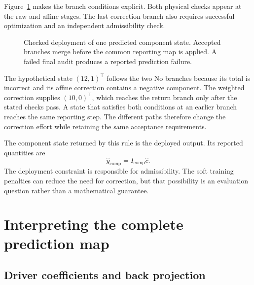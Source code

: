 Figure~\ref{fig:ch5_checked_deployment} makes the branch conditions explicit. Both physical checks appear at the raw and affine stages. The last correction branch also requires successful optimization and an independent admissibility check.

\begin{figure}[htbp]
\centering

\caption{Checked deployment of one predicted component state. Accepted branches merge before the common reporting map is applied. A failed final audit produces a reported prediction failure.}
\label{fig:ch5_checked_deployment}
\end{figure}

The hypothetical state \((12,1)^\top\) follows the two No branches because its total is incorrect and its affine correction contains a negative component. The weighted correction supplies \((10,0)^\top\), which reaches the return branch only after the stated checks pass. A state that satisfies both conditions at an earlier branch reaches the same reporting step. The different paths therefore change the correction effort while retaining the same acceptance requirements.

The component state returned by this rule is the deployed output. Its reported quantities are
\begin{equation}
\label{eq:icsor_deployed_composites}
\widehat y_{\mathrm{comp}}=I_{\mathrm{comp}}\widehat c.
\end{equation}
The deployment constraint is responsible for admissibility. The soft training penalties can reduce the need for correction, but that possibility is an evaluation question rather than a mathematical guarantee.

\section{Interpreting the complete prediction map}

\subsection{Driver coefficients and back projection}


